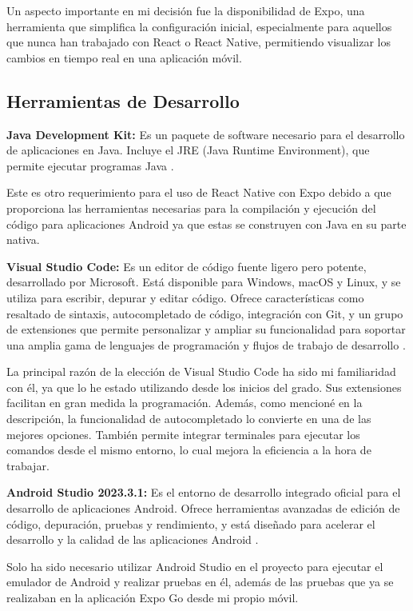 Un aspecto importante en mi decisión fue la disponibilidad de Expo, una herramienta que simplifica la configuración inicial, especialmente para aquellos que nunca han trabajado con React o React Native, permitiendo visualizar los cambios en tiempo real en una aplicación móvil.

\subsection{Herramientas de Desarrollo}

\textbf{Java Development Kit:} Es un paquete de software necesario para el desarrollo de aplicaciones en Java. Incluye el JRE (Java Runtime Environment), que permite ejecutar programas Java \cite{geeksforgeeks}.

Este es otro requerimiento para el uso de React Native con Expo debido a que proporciona las herramientas necesarias para la compilación y ejecución del código para aplicaciones Android ya que estas se construyen con Java en su parte nativa.

\textbf{Visual Studio Code:} Es un editor de código fuente ligero pero potente, desarrollado por Microsoft. Está disponible para Windows, macOS y Linux, y se utiliza para escribir, depurar y editar código. Ofrece características como resaltado de sintaxis, autocompletado de código, integración con Git, y un grupo de extensiones que permite personalizar y ampliar su funcionalidad para soportar una amplia gama de lenguajes de programación y flujos de trabajo de desarrollo \cite{vscode}.

La principal razón de la elección de Visual Studio Code ha sido mi familiaridad con él, ya que lo he estado utilizando desde los inicios del grado. Sus extensiones facilitan en gran medida la programación. Además, como mencioné en la descripción, la funcionalidad de autocompletado lo convierte en una de las mejores opciones. También permite integrar terminales para ejecutar los comandos desde el mismo entorno, lo cual mejora la eficiencia a la hora de trabajar.

\textbf{Android Studio 2023.3.1:} Es el entorno de desarrollo integrado oficial para el desarrollo de aplicaciones Android. Ofrece herramientas avanzadas de edición de código, depuración, pruebas y rendimiento, y está diseñado para acelerar el desarrollo y la calidad de las aplicaciones Android \cite{android}.

Solo ha sido necesario utilizar Android Studio en el proyecto para ejecutar el emulador de Android y realizar pruebas en él, además de las pruebas que ya se realizaban en la aplicación Expo Go desde mi propio móvil.

